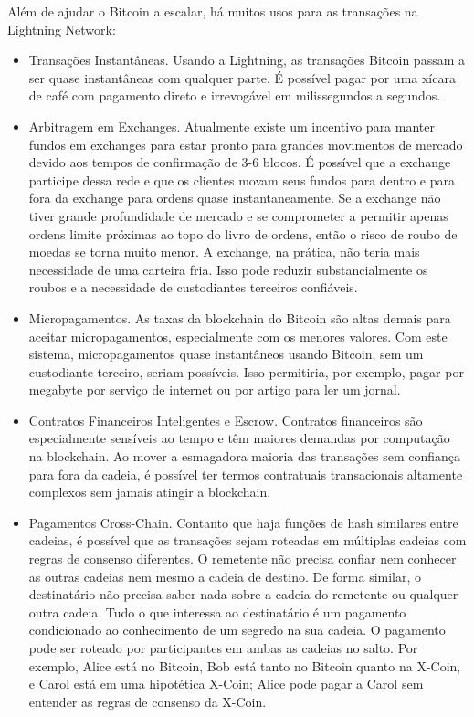\documentclass[letterpaper,11pt]{article}
\begin{document}
Além de ajudar o Bitcoin a escalar, há muitos usos para as transações na
Lightning Network:
\begin{itemize}
	\item Transações Instantâneas. Usando a Lightning, as transações Bitcoin
		passam a ser quase instantâneas com qualquer parte. É possível
		pagar por uma xícara de café com pagamento direto e
		irrevogável em milissegundos a segundos.

	\item Arbitragem em Exchanges. Atualmente existe um incentivo para
		manter fundos em exchanges para estar pronto para grandes
		movimentos de mercado devido aos tempos de confirmação de
		3-6 blocos. É possível que a exchange participe dessa rede e
		que os clientes movam seus fundos para dentro e para fora da
		exchange para ordens quase instantaneamente. Se a exchange
		não tiver grande profundidade de mercado e se comprometer a
		permitir apenas ordens limite próximas ao topo do livro de
		ordens, então o risco de roubo de moedas se torna muito
		menor. A exchange, na prática, não teria mais necessidade de
		uma carteira fria. Isso pode reduzir
		substancialmente os roubos e a necessidade de custodiantes
		terceiros confiáveis.

	\item Micropagamentos. As taxas da blockchain do Bitcoin são altas
		demais para aceitar micropagamentos, especialmente com os
		menores valores. Com este sistema, micropagamentos quase
		instantâneos usando Bitcoin, sem um custodiante terceiro,
		seriam possíveis. Isso permitiria, por exemplo, pagar por
		megabyte por serviço de internet ou por artigo para ler um
		jornal.

	\item Contratos Financeiros Inteligentes e Escrow. Contratos financeiros
		são especialmente sensíveis ao tempo e têm maiores demandas
		por computação na blockchain. Ao mover a esmagadora maioria
		das transações sem confiança para fora da cadeia, é possível
		ter termos contratuais transacionais altamente complexos sem
		jamais atingir a blockchain.

	\item Pagamentos Cross-Chain. Contanto que haja funções de hash
		similares entre cadeias, é possível que as transações sejam
		roteadas em múltiplas cadeias com regras de consenso
		diferentes. O remetente não precisa confiar nem conhecer as
		outras cadeias \textemdash nem mesmo a cadeia de destino. De
		forma similar, o destinatário não precisa saber nada sobre a
		cadeia do remetente ou qualquer outra cadeia. Tudo o que
		interessa ao destinatário é um pagamento condicionado ao
		conhecimento de um segredo na sua cadeia. O pagamento pode
		ser roteado por participantes em ambas as cadeias no salto.
		Por exemplo, Alice está no Bitcoin, Bob está tanto no
		Bitcoin quanto na X-Coin, e Carol está em uma hipotética
		X-Coin; Alice pode pagar a Carol sem entender as regras de
		consenso da X-Coin.

\end{itemize}
\end{document}
